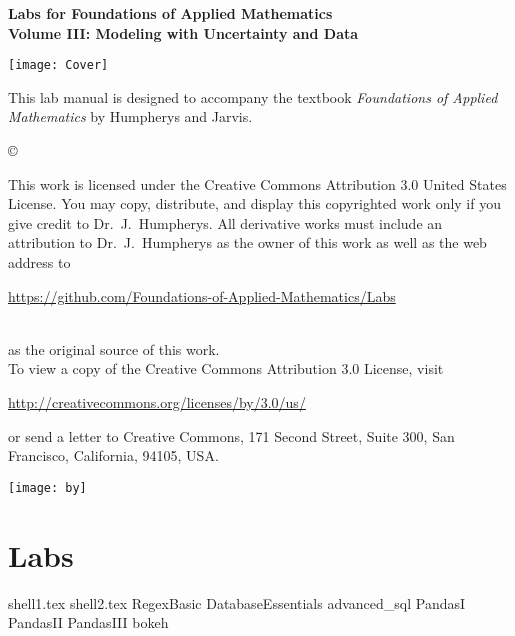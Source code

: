 \documentclass[nociteref]{SIAM-GH-book}
\begin{document}

\thispagestyle{empty} %

\begin{center}
{\huge \bf Labs for Foundations of Applied Mathematics} \\
\vspace{5mm}
{\Large \bf Volume III: Modeling with Uncertainty and Data}
\vspace{20mm}

\texttt{[image: Cover]}
\end{center}
\frontmatter



\begin{thepreface} %

This lab manual is designed to accompany the textbook \emph{Foundations of Applied Mathematics} by Humpherys and Jarvis.

\vfill
\copyright{This work is licensed under the Creative Commons Attribution 3.0 United States
License.  You may copy, distribute, and display this copyrighted work only if you give
credit to Dr.~J.~Humpherys. All derivative works must include an attribution to Dr.~J.~Humpherys as the owner of this work as well as the web address to
\\\centerline{\url{https://github.com/Foundations-of-Applied-Mathematics/Labs}}\\as the original source of this work.
\\To view a copy of the Creative Commons Attribution 3.0 License, visit
\\\centerline{\url{http://creativecommons.org/licenses/by/3.0/us/}} or send a letter to Creative Commons, 171 Second Street, Suite 300, San Francisco, California, 94105, USA.}

\vfill
\centering\texttt{[image: by]}
\vfill
\end{thepreface}

\setcounter{tocdepth}{1}
\tableofcontents

\mainmatter %

\part{Labs} %
{shell1.tex}
{shell2.tex}
{RegexBasic}
{DatabaseEssentials}
{advanced_sql}
{PandasI}
{PandasII}
{PandasIII}
{bokeh}
\end{document}
